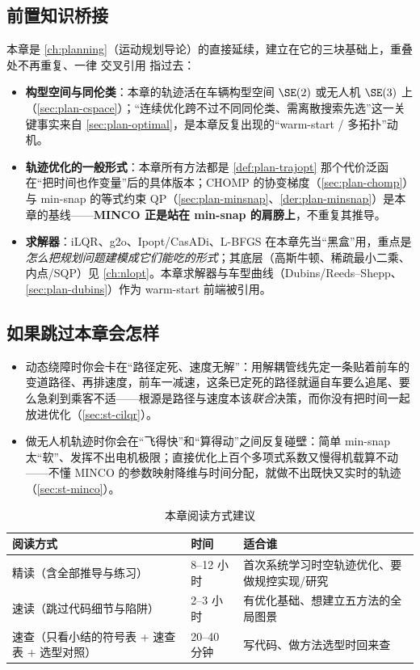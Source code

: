 \subsection*{前置知识桥接}
本章是 \cref{ch:planning}（运动规划导论）的直接延续，建立在它的三块基础上，重叠处不再重复、一律 交叉引用 指过去：
\begin{itemize}
  \item \textbf{构型空间与同伦类}：本章的轨迹活在车辆构型空间 $\SE(2)$ 或无人机 $\SE(3)$ 上（\cref{sec:plan-cspace}）；“连续优化跨不过不同同伦类、需离散搜索先选”这一关键事实来自 \cref{sec:plan-optimal}，是本章反复出现的“warm-start / 多拓扑”动机。
  \item \textbf{轨迹优化的一般形式}：本章所有方法都是 \cref{def:plan-trajopt} 那个代价泛函在“把时间也作变量”后的具体版本；CHOMP 的协变梯度（\cref{sec:plan-chomp}）与 min-snap 的等式约束 QP（\cref{sec:plan-minsnap}、\cref{der:plan-minsnap}）是本章的基线——\textbf{MINCO 正是站在 min-snap 的肩膀上}，不重复其推导。
  \item \textbf{求解器}：iLQR、g2o、Ipopt/CasADi、L-BFGS 在本章先当“黑盒”用，重点是\emph{怎么把规划问题建模成它们能吃的形式}；其底层（高斯牛顿、稀疏最小二乘、内点/SQP）见 \cref{ch:nlopt}。本章求解器与车型曲线（Dubins/Reeds--Shepp、\cref{sec:plan-dubins}）作为 warm-start 前端被引用。
\end{itemize}

\subsection*{如果跳过本章会怎样}
\begin{itemize}
  \item 动态绕障时你会卡在“路径定死、速度无解”：用解耦管线先定一条贴着前车的变道路径、再排速度，前车一减速，这条已定死的路径就逼自车要么追尾、要么急刹到乘客不适——根源是路径与速度本该\emph{联合}决策，而你没有把时间一起放进优化（\cref{sec:st-cilqr}）。
  \item 做无人机轨迹时你会在“飞得快”和“算得动”之间反复碰壁：简单 min-snap 太“软”、发挥不出电机极限；直接优化上百个多项式系数又慢得机载算不动——不懂 MINCO 的参数映射降维与时间分配，就做不出既快又实时的轨迹（\cref{sec:st-minco}）。
\end{itemize}

\begin{table}[H]\centering\small
\caption{本章阅读方式建议}
\label{tab:st-reading}
\begin{tabular}{lll}
\toprule
阅读方式 & 时间 & 适合谁 \\
\midrule
精读（含全部推导与练习） & 8--12 小时 & 首次系统学习时空轨迹优化、要做规控实现/研究 \\
速读（跳过代码细节与陷阱） & 2--3 小时 & 有优化基础、想建立五方法的全局图景 \\
速查（只看小结的符号表 + 速查表 + 选型对照） & 20--40 分钟 & 写代码、做方法选型时回来查 \\
\bottomrule
\end{tabular}
\end{table}

